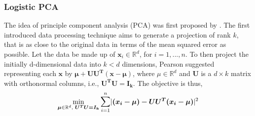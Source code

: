 \documentclass[a4paper,12pt, headsepline]{scrartcl}
\DeclareMathOperator*{\minA}{min}
\numberwithin{equation}{section}
\begin{document}
\subsubsection{Logistic PCA}\label{subsubsec:logp}
The idea of principle component analysis (PCA) was first proposed by \citet{pearson01}. The first introduced data processing technique aims to generate a projection of rank $k$, that is as close to the original data in terms of the mean squared error as possible. Let the data be made up of $\bm x_i \in \mathbb{R}^d$, for $i = 1, ..., n$. To then project the initially d-dimensional data into $k < d$ dimensions, Pearson suggested representing each $\bm x$ by $\bm{\mu + UU^T(x - \mu)}$, where $\mu \in \mathbb{R}^d$ and $\bm U$ is a $d \times k$ matrix with orthonormal columns, i.e., $\bm{U^TU = I_k}$. The objective is thus,
\[
\minA_{\bm \mu \in \mathbb{R}^d,\text{ }\bm{U^TU = I_k}} \mathlarger{\sum}\limits_{i = 1}^{n}|\bm{(x_i - \mu) - UU^T(x_i - \mu)}|^2
\]
\end{document}
